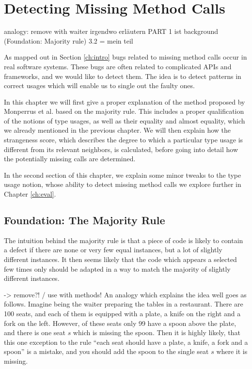 \chapter{Detecting Missing Method Calls}\label{ch:dmmc}

analogy: remove with waiter
irgendwo erläutern PART 1 ist background (Foundation: Majority rule)
3.2 = mein teil


As mapped out in Section \ref{ch:intro} bugs related to missing method calls occur in real software systems.
These bugs are often related to complicated APIs and frameworks, and we would like to detect them.
The idea is to detect patterns in correct usages which will enable us to single out the faulty ones.

In this chapter we will first give a proper explanation of the method proposed by Monperrus et al. \cite{monperrus2010detecting}\cite{monperrus2013detecting} based on the majority rule.
This includes a proper qualification of the notions of type usages, as well as their equality and almost equality, which we already mentioned in the previous chapter.
We will then explain how the strangeness score, which describes the degree to which a particular type usage is different from its relevant neighbors, is calculated, before going into detail how the potentially missing calls are determined.

In the second section of this chapter, we explain some minor tweaks to the type usage notion, whose ability to detect missing method calls we explore further in Chapter \ref{ch:eval}.

\section{Foundation: The Majority Rule}

The intuition behind the majority rule is that a piece of code is likely to contain a defect if there are none or very few equal instances, but a lot of slightly different instances.
It then seems likely that the code which appears a selected few times only should be adapted in a way to match the majority of slightly different instances.

-> remove?! / use with methods!
An analogy which explains the idea well goes as follows.
Imagine being the waiter preparing the tables in a restaurant.
There are 100 seats, and each of them is equipped with a plate, a knife on the right and a fork on the left.
However, of these seats only 99 have a spoon above the plate, and there is one seat $s$ which is missing the spoon.
Then it is highly likely, that this one exception to the rule ``each seat should have a plate, a knife, a fork and a spoon'' is a mistake, and you should add the spoon to the single seat $s$ where it is missing.

